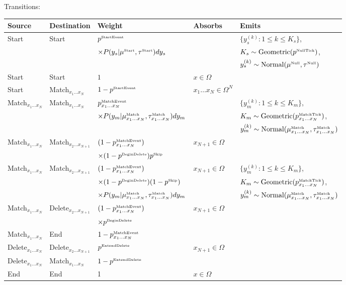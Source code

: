 \documentclass[10pt]{article}
\begin{document}
\noindent Transitions:
\\
\noindent
\begin{tabular}{lllll}
\hline
Source & Destination & Weight & Absorbs & Emits \\
\hline
Start & Start & $p^{\mbox{\tiny StartEvent}}$ & & $\{ y_s^{(k)}: 1 \leq k \leq K_s \}$, \\
& & $\times P(y_s|\mu^{\mbox{\tiny Start}},\tau^{\mbox{\tiny Start}}) dy_s$ & & $K_s \sim \mbox{Geometric}(p^{\mbox{\tiny NullTick}})$, \\
& & & & $y_s^{(k)} \sim \mbox{Normal}(\mu^{\mbox{\tiny Null}},\tau^{\mbox{\tiny Null}})$ \\
Start & Start & $1$ & $x \in \Omega$ & \\
Start & Match${}_{x_1 \ldots x_N}$ & $1 - p^{\mbox{\tiny StartEvent}}$ & $x_1 \ldots x_N \in \Omega^N$ & \\
Match${}_{x_1 \ldots x_N}$ & Match${}_{x_1 \ldots x_N}$ & ${p^{\mbox{\tiny MatchEvent}}_{x_1\ldots x_N}}$ & & $\{ y_m^{(k)}: 1 \leq k \leq K_m \}$, \\
& & $\times P(y_m|\mu^{\mbox{\tiny Match}}_{x_1\ldots x_N},\tau^{\mbox{\tiny Match}}_{x_1\ldots x_N}) dy_m$ & & $K_m \sim \mbox{Geometric}(p^{\mbox{\tiny MatchTick}}_{x_1\ldots x_N})$, \\
& & & & $y_m^{(k)} \sim \mbox{Normal}(\mu^{\mbox{\tiny Match}}_{x_1\ldots x_N},\tau^{\mbox{\tiny Match}}_{x_1\ldots x_N})$ \\
Match${}_{x_1 \ldots x_N}$ & Match${}_{x_2 \ldots x_{N+1}}$ & $(1 - {p^{\mbox{\tiny MatchEvent}}_{x_1\ldots x_N}})$ & $x_{N+1} \in \Omega$ & \\
& & $\times (1 - p^{\mbox{\tiny BeginDelete}}) p^{\mbox{\tiny Skip}}$ & & \\
Match${}_{x_1 \ldots x_N}$ & Match${}_{x_2 \ldots x_{N+1}}$ & $(1 - {p^{\mbox{\tiny MatchEvent}}_{x_1\ldots x_N}})$ & $x_{N+1} \in \Omega$ & $\{ y_m^{(k)}: 1 \leq k \leq K_m \}$, \\
& & $\times (1 - p^{\mbox{\tiny BeginDelete}}) (1 - p^{\mbox{\tiny Skip}})$ & & $K_m \sim \mbox{Geometric}(p^{\mbox{\tiny MatchTick}}_{x_1\ldots x_N})$, \\
& & $\times P(y_m|\mu^{\mbox{\tiny Match}}_{x_1\ldots x_N},\tau^{\mbox{\tiny Match}}_{x_1\ldots x_N}) dy_m$ & & $y_m^{(k)} \sim \mbox{Normal}(\mu^{\mbox{\tiny Match}}_{x_1\ldots x_N},\tau^{\mbox{\tiny Match}}_{x_1\ldots x_N})$ \\
Match${}_{x_1 \ldots x_N}$ & Delete${}_{x_2 \ldots x_{N+1}}$ & $(1 - {p^{\mbox{\tiny MatchEvent}}_{x_1\ldots x_N}})$ & $x_{N+1} \in \Omega$ & \\
& & $\times p^{\mbox{\tiny BeginDelete}}$ & & \\
Match${}_{x_1 \ldots x_N}$ & End & $1 - {p^{\mbox{\tiny MatchEvent}}_{x_1\ldots x_N}}$ & & \\
Delete${}_{x_1 \ldots x_N}$ & Delete${}_{x_2 \ldots x_{N+1}}$ & $p^{\mbox{\tiny ExtendDelete}}$ & $x_{N+1} \in \Omega$ & \\
Delete${}_{x_1 \ldots x_N}$ & Match${}_{x_1 \ldots x_N}$ & $1 - p^{\mbox{\tiny ExtendDelete}}$ & & \\
End & End & 1 & $x \in \Omega$ & \\
\hline
\end{tabular}
\end{document}
